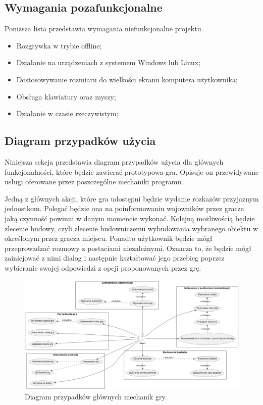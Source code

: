 \subsection{Wymagania pozafunkcjonalne}\label{ss:nonfun}
Poniższa lista przedstawia wymagania niefunkcjonalne projektu.

\begin{itemize}\label{list:nonfun}
  \item Rozgrywka w trybie offline;
  \item Działanie na urządzeniach z systemem Windows lub Linux;
  \item Dostosowywanie rozmiaru do wielkości ekranu komputera użytkownika;
  \item Obsługa klawiatury oraz myszy;
  \item Działanie w czasie rzeczywistym;
\end{itemize}

\subsection{Diagram przypadków użycia}\label{ss:usecase}
Niniejsza sekcja przedstawia diagram przypadków użycia dla głównych funkcjonalności, które będzie zawierać prototypowa gra.
Opisuje on przewidywane usługi oferowane przez poszczególne mechaniki programu.

Jedną z głównych akcji, które gra udostępni będzie wydanie rozkazów przyjaznym jednostkom. Polegać będzie ona na poinformowaniu
wojowników przez gracza jaką czynność powinni w danym momencie wykonać. Kolejną możliwością będzie zlecenie budowy, czyli
zlecenie budowniczemu wybudowania wybranego obiektu w określonym przez gracza miejscu. Ponadto użytkownik
będzie mógł przeprowadzać rozmowy z postaciami niezależnymi. Oznacza to, że będzie mógł zainicjować z nimi dialog i
następnie kształtować jego przebieg poprzez wybieranie swojej odpowiedzi z opcji proponowanych przez grę.

\begin{figure}[!htbp]
    \centering
    \includegraphics[width=1.0\textwidth]{images/diagrams/usecase.jpg}
    \caption{Diagram przypadków głównych mechanik gry.}\label{fig:usecases}
\end{figure}
\FloatBarrier

